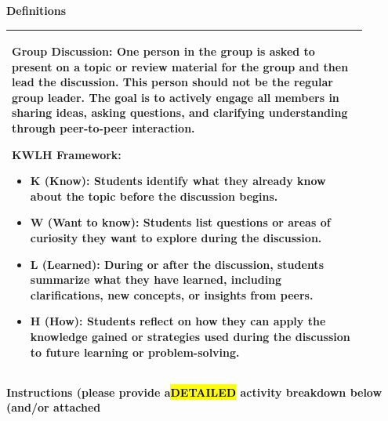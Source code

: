 \documentclass{article}
\begin{document}
\vspace{0.5cm}
{\large\textbf{Definitions}}
\\
\begin{tabular}{|p{0.9\linewidth}|}
\hline
\begin{minipage}[t]{0.9\linewidth}

\textbf{Group Discussion:} One person in the group is asked to present on a topic or review material for the group and then lead the discussion. This person should not be the regular group leader. The goal is to actively engage all members in sharing ideas, asking questions, and clarifying understanding through peer-to-peer interaction.

\textbf{KWLH Framework:}
\begin{itemize}
    \item \textbf{K (Know):} Students identify what they already know about the topic before the discussion begins.
    \item \textbf{W (Want to know):} Students list questions or areas of curiosity they want to explore during the discussion.
    \item \textbf{L (Learned):} During or after the discussion, students summarize what they have learned, including clarifications, new concepts, or insights from peers.
    \item \textbf{H (How):} Students reflect on how they can apply the knowledge gained or strategies used during the discussion to future learning or problem-solving.
\end{itemize}

\end{minipage} \\
\hline
\end{tabular}
\newpage
\noindent
{\large\textbf{Instructions (please provide a\hl{DETAILED} activity breakdown below (and/or attached}}\\
\end{document}
